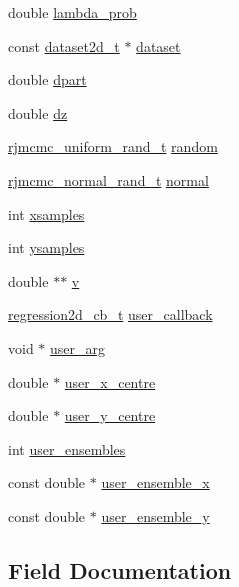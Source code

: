 \begin{DoxyCompactItemize}
\item 
double \hyperlink{structpart2d_af4bbaff518db334c7942c7d3a18a487d}{lambda\+\_\+prob}
\item 
const \hyperlink{dataset2d_8h_a942e85acecf08479c1a4e58600cfe40a}{dataset2d\+\_\+t} $\ast$ \hyperlink{structpart2d_adba12a9311837fd7fdaac9e31e30be09}{dataset}
\item 
double \hyperlink{structpart2d_a5bebab97b87fb0a05ef69c3d9519efc0}{dpart}
\item 
double \hyperlink{structpart2d_a6d20d14137cf33ceac2ee605909f7271}{dz}
\item 
\hyperlink{rjmcmc__random_8h_accc36e83459ada552d8f70962190dac0}{rjmcmc\+\_\+uniform\+\_\+rand\+\_\+t} \hyperlink{structpart2d_aa876ee904fd268d0129fd8de8f74e62d}{random}
\item 
\hyperlink{rjmcmc__random_8h_a498625755d377b68ad37c9ab360e83b0}{rjmcmc\+\_\+normal\+\_\+rand\+\_\+t} \hyperlink{structpart2d_a4a29a9791749706ade7ebdf251605eec}{normal}
\item 
int \hyperlink{structpart2d_a0c3b43615615bca4c6921b3f7412797b}{xsamples}
\item 
int \hyperlink{structpart2d_a386cc57c85c14ade5666b0cc44d97d4e}{ysamples}
\item 
double $\ast$$\ast$ \hyperlink{structpart2d_ab71005708c61f1816df818fd2f19d403}{v}
\item 
\hyperlink{regression_8h_a7cb8595f1ee80ae521e3d10d6123dbf3}{regression2d\+\_\+cb\+\_\+t} \hyperlink{structpart2d_a112f610839d74b0af24794c7442f87a9}{user\+\_\+callback}
\item 
void $\ast$ \hyperlink{structpart2d_a90ef8ea6d957e6071da0d194604882d2}{user\+\_\+arg}
\item 
double $\ast$ \hyperlink{structpart2d_a0b2cdfa694b427e708ffe16229791240}{user\+\_\+x\+\_\+centre}
\item 
double $\ast$ \hyperlink{structpart2d_ad231783a3d59a2dccc9b25f5b9744ed9}{user\+\_\+y\+\_\+centre}
\item 
int \hyperlink{structpart2d_a24f027dbc300017992443f903760a74b}{user\+\_\+ensembles}
\item 
const double $\ast$ \hyperlink{structpart2d_ad32ef0508bbc66d928719df1b12f7387}{user\+\_\+ensemble\+\_\+x}
\item 
const double $\ast$ \hyperlink{structpart2d_aeb3a65f1156f2e76b22a10713969a844}{user\+\_\+ensemble\+\_\+y}
\end{DoxyCompactItemize}


\subsection{Field Documentation}
